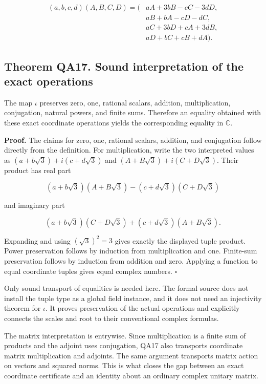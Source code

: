 \[
\begin{aligned}
(a,b,c,d)(A,B,C,D)=\big(&aA+3bB-cC-3dD,\\
&aB+bA-cD-dC,\\
&aC+3bD+cA+3dB,\\
&aD+bC+cB+dA\big).
\end{aligned}
\]

\hypertarget{theorem-qa17.-sound-interpretation-of-the-exact-operations}{%
\subsection*{Theorem QA17. Sound interpretation of the exact
operations}\label{theorem-qa17.-sound-interpretation-of-the-exact-operations}}

The map \(\iota\) preserves zero, one, rational scalars, addition,
multiplication, conjugation, natural powers, and finite sums. Therefore
an equality obtained with these exact coordinate operations yields the
corresponding equality in \(\mathbb C\).

\textbf{Proof.} The claims for zero, one, rational scalars, addition,
and conjugation follow directly from the definition. For multiplication,
write the two interpreted values as \((a+b\sqrt3)+i(c+d\sqrt3)\) and
\((A+B\sqrt3)+i(C+D\sqrt3)\). Their product has real part

\[
(a+b\sqrt3)(A+B\sqrt3)-(c+d\sqrt3)(C+D\sqrt3)
\]

and imaginary part

\[
(a+b\sqrt3)(C+D\sqrt3)+(c+d\sqrt3)(A+B\sqrt3).
\]

Expanding and using \((\sqrt3)^2=3\) gives exactly the displayed tuple
product. Power preservation follows by induction from multiplication and
one. Finite-sum preservation follows by induction from addition and
zero. Applying a function to equal coordinate tuples gives equal complex
numbers. \(\square\)

Only sound transport of equalities is needed here. The formal source
does not install the tuple type as a global field instance, and it does
not need an injectivity theorem for \(\iota\). It proves preservation of
the actual operations and explicitly connects the scales and root to
their conventional complex formulas.

The matrix interpretation is entrywise. Since multiplication is a finite
sum of products and the adjoint uses conjugation, QA17 also transports
coordinate matrix multiplication and adjoints. The same argument
transports matrix action on vectors and squared norms. This is what
closes the gap between an exact coordinate certificate and an identity
about an ordinary complex unitary matrix.

